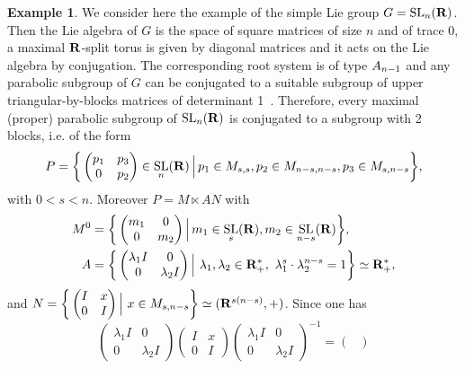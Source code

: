 \documentclass[11pt]{article}
\theoremstyle{definition}
\newtheorem{exam}[theo]{Example}
\numberwithin{equation}{section}
\numberwithin{figure}{section}
\numberwithin{table}{section}
\DeclareMathOperator{\SL}{SL}
\begin{document}
\begin{exam}\label{ex_SL}
We consider here the example of the simple Lie group $G = \SL_n({\bf R})$. Then the Lie algebra of $G$ is the space of square matrices of size $n$ and of trace 0, a maximal ${\bf R}$-split torus is given by diagonal matrices and it acts on the Lie algebra by conjugation. The corresponding root system is of type ${\rm A}_{n-1}$ and any parabolic subgroup of $G$ can be conjugated to a suitable subgroup of upper triangular-by-blocks matrices of determinant 1~\cite[11.14]{Borel-Arith}. Therefore, every maximal (proper) parabolic subgroup of $\SL_n({\bf R})$ is conjugated to a subgroup with 2 blocks, i.e. of the form
\[
P = \bigg\{
\begin{pmatrix}
p_1 & p_3 \\
0 & p_2
\end{pmatrix}
\in \SL_n({\bf R})\,\Big\vert\,p_1 \in M_{s,s}, p_2 \in M_{n-s,n-s}, p_3 \in M_{s,n-s}\bigg\},
\]
with $0<s<n$. Moreover $P = M \ltimes AN$ with
\begin{align*}
M^0 &= \bigg\{
\begin{pmatrix}
m_1 & 0 \\
0 & m_2
\end{pmatrix}
\Big\vert\,m_1 \in \SL_s({\bf R}), m_2 \in \SL_{n-s}({\bf R})\bigg\},
\\
A &= \bigg\{
\begin{pmatrix}
\lambda_1 I & 0 \\
0 & \lambda_2 I
\end{pmatrix}
\Big\vert~\lambda_1,\lambda_2 \in {\bf R} ^* _+,~\lambda_1 ^s \cdot \lambda_2 ^{n-s} =1 \bigg\} \simeq {\bf R} ^* _+,
\end{align*}
and $N =\bigg\{
\begin{pmatrix}
I & x \\
0 & I
\end{pmatrix}
\Big\vert~x \in M_{s, n-s} \bigg\} \simeq ({\bf R} ^{s(n-s)}, +)$. Since one has
\[
\begin{pmatrix}
\lambda_1 I & 0 \\
0 & \lambda_2 I
\end{pmatrix}
\!
\begin{pmatrix}
I & x \\
0 & I
\end{pmatrix}
\!
\begin{pmatrix}
\lambda_1 I & 0 \\
0 & \lambda_2 I
\end{pmatrix} ^{-1} =
\begin{pmatrix}

\end{pmatrix}\]
\end{exam}
\end{document}
